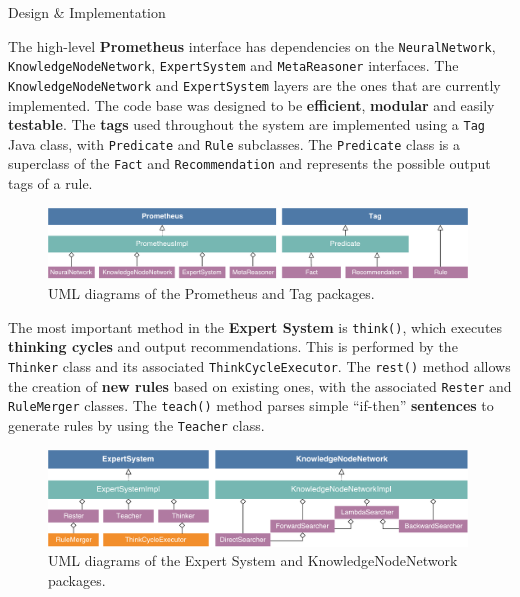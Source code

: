 \documentclass[final]{beamer} %
\newcommand{\code}[1]{\texttt{#1}}
\begin{document}
\begin{frame}
\begin{columns}
\begin{column}{.33\textwidth}
{				\begin{block}{Design \& Implementation}
					\parbox{0.99\textwidth}{
					The high-level \textbf{Prometheus} interface has dependencies on the \code{NeuralNetwork}, \code{KnowledgeNodeNetwork}, \code{ExpertSystem} and \code{MetaReasoner} interfaces. The \code{KnowledgeNodeNetwork} and \code{ExpertSystem} layers are the ones that are currently implemented. The code base was designed to be \textbf{efficient}, \textbf{modular} and easily \textbf{testable}. The \textbf{tags} used throughout the system are implemented using a \code{Tag} Java class, with \code{Predicate} and \code{Rule} subclasses. The \code{Predicate} class is a superclass of the \code{Fact} and \code{Recommendation} and represents the possible output tags of a rule.}
				
					\begin{figure}
						\centering
						\includegraphics[width=0.99\textwidth]{figures/uml_combined_1.pdf}
						\caption{UML diagrams of the Prometheus and Tag packages.}
					\end{figure}			
				
					\parbox{0.99\textwidth}{
					The most important method in the \textbf{Expert System} is \code{think()}, which executes \textbf{thinking cycles} and output recommendations. This is performed by the \code{Thinker} class and its associated \code{ThinkCycleExecutor}. The \code{rest()} method allows the creation of \textbf{new rules} based on existing ones, with the associated \code{Rester} and \code{RuleMerger} classes. The \code{teach()} method parses simple ``if-then'' \textbf{sentences} to generate rules by using the \code{Teacher} class.}
				
					\begin{figure}
						\centering
						\includegraphics[width=0.99\textwidth]{figures/uml_combined_3.pdf}
						\caption{UML diagrams of the Expert System and KnowledgeNodeNetwork packages.}
					\end{figure}
				

\end{block}}
\end{column}
\end{columns}
\end{frame}
\end{document}

